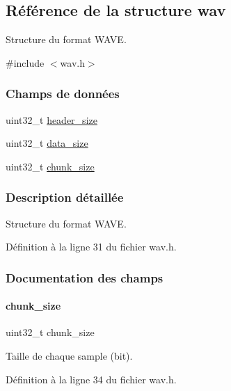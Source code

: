\hypertarget{a00178}{}\subsection{Référence de la structure wav}
\label{a00178}


Structure du format W\+A\+VE.  




{\ttfamily \#include $<$wav.\+h$>$}

\subsubsection*{Champs de données}
\begin{DoxyCompactItemize}
\item 
uint32\+\_\+t \hyperlink{a00178_a841923a20e6dda97c59351c8e97c9be6}{header\+\_\+size}
\item 
uint32\+\_\+t \hyperlink{a00178_ab670c6c21aced4765ecd6b29283f22b0}{data\+\_\+size}
\item 
uint32\+\_\+t \hyperlink{a00178_ad8162ca27244a6af61afe6116378b4bb}{chunk\+\_\+size}
\end{DoxyCompactItemize}


\subsubsection{Description détaillée}
Structure du format W\+A\+VE. 

Définition à la ligne 31 du fichier wav.\+h.



\subsubsection{Documentation des champs}
\mbox{\label{a00178_ad8162ca27244a6af61afe6116378b4bb}} 
\paragraph{\texorpdfstring{chunk\+\_\+size}{chunk\_size}}
{\footnotesize\ttfamily uint32\+\_\+t chunk\+\_\+size}

Taille de chaque sample (bit). 

Définition à la ligne 34 du fichier wav.\+h.

\mbox{\label{a00178_ab670c6c21aced4765ecd6b29283f22b0}} 
